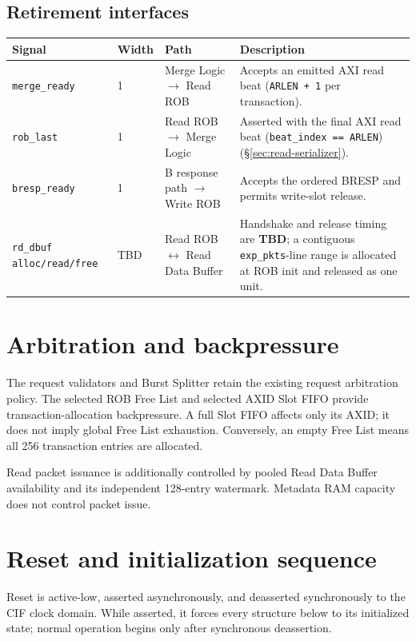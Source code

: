 \subsection{Retirement interfaces}
\begin{longtable}{p{3.3cm}p{1cm}p{3.4cm}p{7cm}}
\toprule
\textbf{Signal} & \textbf{Width} & \textbf{Path} & \textbf{Description}\\
\midrule
\texttt{merge\_ready} & 1 & Merge Logic $\rightarrow$ Read ROB & Accepts an emitted AXI read beat (\texttt{ARLEN + 1} per transaction).\\
\texttt{rob\_last} & 1 & Read ROB $\rightarrow$ Merge Logic & Asserted with the final AXI read beat (\texttt{beat\_index == ARLEN}) (\S\ref{sec:read-serializer}).\\
\texttt{bresp\_ready} & 1 & B response path $\rightarrow$ Write ROB & Accepts the ordered BRESP and permits write-slot release.\\
\texttt{rd\_dbuf alloc/read/free} & TBD & Read ROB $\leftrightarrow$ Read Data Buffer & Handshake and release timing are \textbf{TBD}; a contiguous \texttt{exp\_pkts}-line range is allocated at ROB init and released as one unit.\\
\bottomrule
\end{longtable}

\section{Arbitration and backpressure}

The request validators and Burst Splitter retain the existing request
arbitration policy.  The selected ROB Free List and selected AXID Slot FIFO
provide transaction-allocation backpressure.  A full Slot FIFO affects only
its AXID; it does not imply global Free List exhaustion.  Conversely, an empty
Free List means all 256 transaction entries are allocated.

Read packet issuance is additionally controlled by pooled Read Data Buffer
availability and its independent 128-entry watermark.  Metadata RAM capacity
does not control packet issue.

\section{Reset and initialization sequence}
\label{sec:resetseq}

Reset is active-low, asserted asynchronously, and deasserted synchronously to
the CIF clock domain.  While asserted, it forces every structure below to its
initialized state; normal operation begins only after synchronous
deassertion.

